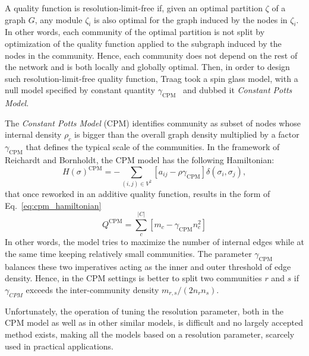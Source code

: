A quality function is resolution-limit-free if, given an optimal partition $\zeta$ of a graph $G$, any module $\zeta_i$ is also optimal for the graph induced by the nodes in $\zeta_i$.
In other words, each community of the optimal partition is not split by optimization of the quality function applied to the subgraph induced by the nodes in the community.
Hence, each community does not depend on the rest of the network and is both locally and globally optimal.
Then, in order to design such resolution-limit-free quality function, Traag took a spin glass model, with a null model specified by constant quantity $\gamma_{\textrm{CPM}}$~\cite{traag2011} and dubbed it \emph{Constant Potts Model}.

The \emph{Constant Potts Model} (CPM) identifies community as subset of nodes whose internal density $\rho_c$ is bigger than the overall graph density multiplied by a factor $\gamma_{\textrm{CPM}}$ that defines the typical scale of the communities. In the framework of Reichardt and Bornholdt, the CPM model has the following Hamiltonian: 
\begin{equation}\label{eq:cpm_hamiltonian}
H(\sigma)^{\textrm{CPM}} = - \sum \limits_{(i,j) \in V^2} \left[ a_{ij} - \rho \gamma_{\textrm{CPM}} \right] \delta(\sigma_i,\sigma_j),
\end{equation}
that once reworked in an additive quality function, results in the form of Eq.~\ref{eq:cpm_hamiltonian} 
\begin{equation}\label{eq:cpm_ermodel}
Q^{\textrm{CPM}} = \sum \limits_c^{|C|} \left[m_c - \gamma_{\textrm{CPM}} n_c^2 \right] 
\end{equation}
In other words, the model tries to maximize the number of internal edges while at the same time keeping relatively small communities. The parameter $\gamma_{\textrm{CPM}}$ balances these two imperatives acting as the inner and outer threshold of edge density.
Hence, in the CPM settings is better to split two communities $r$ and $s$ if $\gamma_{CPM}$ exceeds the inter-community density $m_{r,s}/(2n_r n_s)$.

Unfortunately, the operation of tuning the resolution parameter, both in the CPM model as well as in other similar models, is difficult and no largely accepted method exists, making all the models based on a resolution parameter, scarcely used in practical applications.


